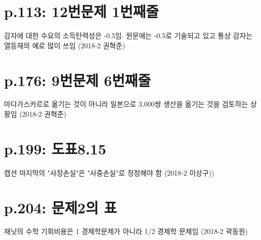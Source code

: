 \documentclass[a4paper]{article}
\begin{document}
\section{p.113: 12번문제 1번째줄} %
\label{sec:p_113_12}
감자에 대한 수요의 소득탄력성은 -0.5임. 원문에는 -0.5로 기술되고 있고 통상 감자는 열등재의 예로 많이 쓰임 (2018-2 권혁준)

\section{p.176: 9번문제 6번째줄} %
\label{sec:p_176_9}
마다가스카르로 옮기는 것이 아니라 일본으로 3,000쌍 생산을 옮기는 것을 검토하는 상황임 (2018-2 권혁준)

\section{p.199: 도표8.15} %
\label{sec:p_199_}
캡션 마지막의 "사장손실"은 "사중손실"로 정정해야 함 (2018-2 이상구))

\section{p.204: 문제2의 표} %
\label{sec:p_204_}
재닛의 수학 기회비용은 1 경제학문제가 아니라 1/2 경제학 문제임
(2018-2 곽동원)
\end{document}

